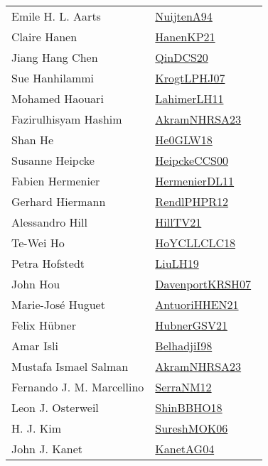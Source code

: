 {\begin{longtable}{p{4cm}p{20cm}}
Emile H. L. Aarts & \href{}{NuijtenA94}~\cite{NuijtenA94}\\
Claire Hanen & \href{papers/HanenKP21.pdf}{HanenKP21}~\cite{HanenKP21}\\
Jiang Hang Chen & \href{articles/QinDCS20.pdf}{QinDCS20}~\cite{QinDCS20}\\
Sue Hanhilammi & \href{papers/KrogtLPHJ07.pdf}{KrogtLPHJ07}~\cite{KrogtLPHJ07}\\
Mohamed Haouari & \href{papers/LahimerLH11.pdf}{LahimerLH11}~\cite{LahimerLH11}\\
Fazirulhisyam Hashim & \href{articles/AkramNHRSA23.pdf}{AkramNHRSA23}~\cite{AkramNHRSA23}\\
Shan He & \href{papers/He0GLW18.pdf}{He0GLW18}~\cite{He0GLW18}\\
Susanne Heipcke & \href{articles/HeipckeCCS00.pdf}{HeipckeCCS00}~\cite{HeipckeCCS00}\\
Fabien Hermenier & \href{papers/HermenierDL11.pdf}{HermenierDL11}~\cite{HermenierDL11}\\
Gerhard Hiermann & \href{papers/RendlPHPR12.pdf}{RendlPHPR12}~\cite{RendlPHPR12}\\
Alessandro Hill & \href{papers/HillTV21.pdf}{HillTV21}~\cite{HillTV21}\\
Te{-}Wei Ho & \href{papers/HoYCLLCLC18.pdf}{HoYCLLCLC18}~\cite{HoYCLLCLC18}\\
Petra Hofstedt & \href{papers/LiuLH19.pdf}{LiuLH19}~\cite{LiuLH19}\\
John Hou & \href{papers/DavenportKRSH07.pdf}{DavenportKRSH07}~\cite{DavenportKRSH07}\\
Marie{-}Jos{\'{e}} Huguet & \href{papers/AntuoriHHEN21.pdf}{AntuoriHHEN21}~\cite{AntuoriHHEN21}\\
Felix H{\"{u}}bner & \href{articles/HubnerGSV21.pdf}{HubnerGSV21}~\cite{HubnerGSV21}\\
Amar Isli & \href{articles/BelhadjiI98.pdf}{BelhadjiI98}~\cite{BelhadjiI98}\\
Mustafa Ismael Salman & \href{articles/AkramNHRSA23.pdf}{AkramNHRSA23}~\cite{AkramNHRSA23}\\
Fernando J. M. Marcellino & \href{papers/SerraNM12.pdf}{SerraNM12}~\cite{SerraNM12}\\
Leon J. Osterweil & \href{articles/ShinBBHO18.pdf}{ShinBBHO18}~\cite{ShinBBHO18}\\
H. J. Kim & \href{}{SureshMOK06}~\cite{SureshMOK06}\\
John J. Kanet & \href{}{KanetAG04}~\cite{KanetAG04}\\

\end{longtable}}
